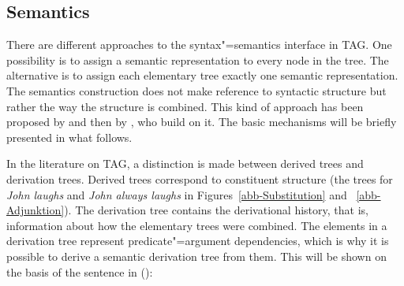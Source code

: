 \subsection{Semantics}

There are different approaches to the syntax"=semantics interface in TAG.
One possibility is to assign a semantic representation to every node in the tree. The alternative is to assign each elementary tree
exactly one semantic representation. The semantics construction does not make reference to syntactic structure but rather the way
the structure is combined. This kind of approach has been proposed by \citet{CK98a} and then by \citet{KJ2003a}, who build on it.
The basic mechanisms will be briefly presented in what follows.

In the literature on TAG, a distinction is made between derived trees and derivation trees.
Derived trees correspond to constituent structure (the trees for \emph{John laughs} and
\emph{John always laughs} in Figures~\ref{abb-Substitution} and ~\ref{abb-Adjunktion}).
The derivation tree contains the derivational history, that is, information about how the elementary trees were combined.
The elements in a derivation tree represent predicate"=argument dependencies, which is why it is possible to derive
a semantic derivation tree from them. This will be shown on the basis of the sentence in ():

